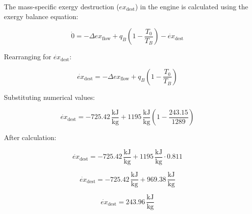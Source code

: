 The mass-specific exergy destruction (\( ex_{\text{dest}} \)) in the engine is calculated using the exergy balance equation:

\[
\dot{0} = -\Delta ex_{\text{flow}} + q_B \left( 1 - \frac{T_0}{T_B} \right) - \dot{ex}_{\text{dest}}
\]

Rearranging for \( \dot{ex}_{\text{dest}} \):

\[
\dot{ex}_{\text{dest}} = -\Delta ex_{\text{flow}} + q_B \left( 1 - \frac{T_0}{T_B} \right)
\]

Substituting numerical values:

\[
\dot{ex}_{\text{dest}} = -725.42 \, \frac{\text{kJ}}{\text{kg}} + 1195 \, \frac{\text{kJ}}{\text{kg}} \left( 1 - \frac{243.15}{1289} \right)
\]

After calculation:

\[
\dot{ex}_{\text{dest}} = -725.42 \, \frac{\text{kJ}}{\text{kg}} + 1195 \, \frac{\text{kJ}}{\text{kg}} \cdot 0.811
\]

\[
\dot{ex}_{\text{dest}} = -725.42 \, \frac{\text{kJ}}{\text{kg}} + 969.38 \, \frac{\text{kJ}}{\text{kg}}
\]

\[
\dot{ex}_{\text{dest}} = 243.96 \, \frac{\text{kJ}}{\text{kg}}
\]